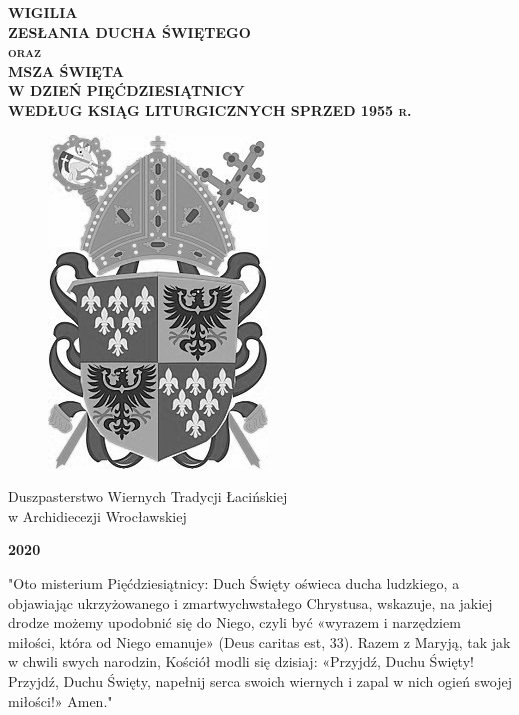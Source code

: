 \documentclass[10pt,a5paper]{book}
\begin{document}
\thispagestyle{empty}

\begin{center}
	\vspace*{0.5cm}


	\bfseries\scshape
	\huge WIGILIA \\ ZESŁANIA DUCHA ŚWIĘTEGO \\\medskip
	\Large oraz \\\medskip
	\huge MSZA ŚWIĘTA \\ W DZIEŃ PIĘĆDZIESIĄTNICY \\\bigskip
	\large WEDŁUG KSIĄG LITURGICZNYCH SPRZED 1955 r.

	\vfill


	\vfill

	\begin{figure}[h]
		\centering
		\includegraphics[width=0.3\linewidth]{logo.jpg}
	\end{figure}

	\vfill

	{\large Duszpasterstwo Wiernych Tradycji Łacińskiej \\ w Archidiecezji
		Wrocławskiej}

	\bigskip

	{\Large \textbf{2020}}


\end{center}


\newpage
\thispagestyle{empty}

\vspace*{2cm}
"Oto misterium Pięćdziesiątnicy: Duch Święty oświeca ducha ludzkiego, a
objawiając ukrzyżowanego i zmartwychwstałego Chrystusa, wskazuje, na jakiej
drodze możemy upodobnić się do Niego, czyli być «wyrazem i narzędziem miłości,
która od Niego emanuje» (Deus caritas est, 33). Razem z Maryją, tak jak w chwili
swych narodzin, Kościół modli się dzisiaj: «Przyjdź, Duchu Święty! Przyjdź,
Duchu Święty, napełnij serca swoich wiernych i zapal w nich ogień swojej
miłości!» Amen."
\end{document}

